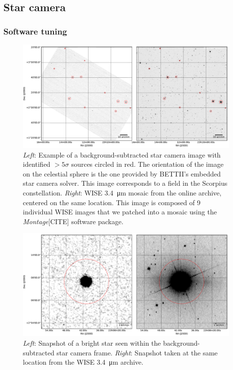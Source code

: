 \subsection{Star camera}
\subsubsection{Software tuning}

\begin{landscape}
\begin{figure}[!ht]
	\centering
	\includegraphics[width=1.5\textwidth]{Figures/starcam_images.pdf}
	\caption[Star camera example WISE]{\textit{Left}: Example of a background-subtracted star camera image with identified $>5\sigma$ sources circled in red. The orientation of the image on the celestial sphere is the one provided by BETTII's embedded star camera solver. This image corresponds to a field in the Scorpius constellation. \textit{Right}: WISE \SI{3.4}{\um} mosaic from the online archive, centered on the same location. This image is composed of 9 individual WISE images that we patched into a mosaic using the \textit{Montage}[CITE] software package.}
	\label{fig:starcamexample}
    \end{figure}
\end{landscape}
\begin{landscape}
\begin{figure}[!ht]
	\centering
	\includegraphics[width=1.5\textwidth]{Figures/starcam_SDSSr_zoom.pdf}
	\caption[Star camera individual star]{\textit{Left}: Snapshot of a bright star seen within the background-subtracted star camera frame. \textit{Right}: Snapshot taken at the same location from the WISE \SI{3.4}{\um} archive.}
	\label{fig:starcamzoom}
    \end{figure}
\end{landscape}

